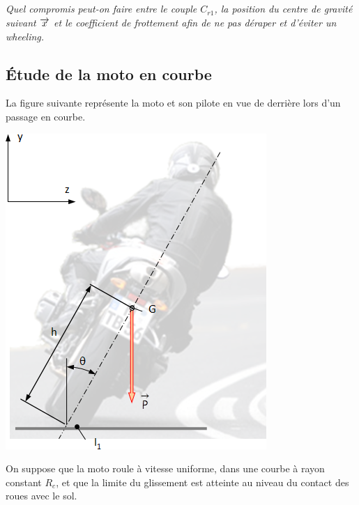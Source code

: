 \documentclass[10pt,fleqn]{article} %
\begin{document}
\begin{multicols}{2}
\subparagraph{}
\textit{Quel compromis peut-on faire entre le couple $C_{r1}$, la position du centre de gravité suivant $\overrightarrow{x}$ et le coefficient de frottement afin de ne pas déraper et d’éviter un wheeling.}
\ifprof
\begin{corrige}
\end{corrige}
\else
\fi

\newpage 

\subsection*{Étude de la moto en courbe}
La figure suivante représente la moto et son pilote en vue de derrière lors d’un passage en courbe.

\begin{center}
\includegraphics[width=\linewidth]{images/fig_03}
\end{center}



On suppose que la moto roule à vitesse uniforme, dans une courbe à rayon constant $R_c$, et que la limite du glissement est atteinte au niveau du contact des roues avec le sol.


\end{multicols}
\end{document}
